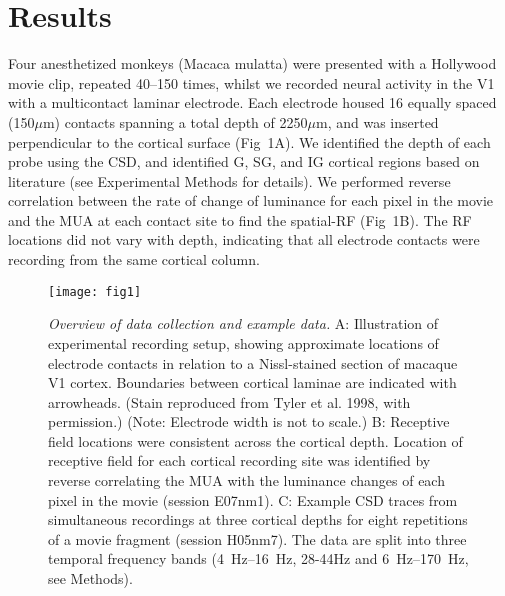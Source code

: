 \section{Results}
Four anesthetized monkeys (Macaca mulatta) were presented with a Hollywood movie clip, repeated 40--150 times, whilst we recorded neural activity in the \ac{V1} with a multicontact laminar electrode.
Each electrode housed 16 equally spaced (150\hspace{0.2em}$\mu$m) contacts spanning a total depth of 2250\hspace{0.2em}$\mu$m, and was inserted perpendicular to the cortical surface (Fig~1A).
We identified the depth of each probe using the \ac{CSD}, and identified \ac{G}, \ac{SG}, and \ac{IG} cortical regions based on literature (see Experimental Methods for details).
We performed reverse correlation between the rate of change of luminance for each pixel in the movie and the \ac{MUA} at each contact site to find the spatial-\ac{RF} (Fig~1B).
The \ac{RF} locations did not vary with depth, indicating that all electrode contacts were recording from the same cortical column.

\begin{figure}[htbp]
\centering \texttt{[image: fig1]}
%
\caption{%
\textit{Overview of data collection and example data.}
A: Illustration of experimental recording setup, showing approximate locations 
of electrode contacts in relation to a Nissl-stained section of macaque \ac{V1} 
cortex.
Boundaries between cortical laminae are indicated with arrowheads.
(Stain reproduced from Tyler et al. 1998, with permission.) (Note: Electrode 
width is not to scale.)
B: Receptive field locations were consistent across the 
cortical depth.
Location of receptive field for each cortical recording site 
was identified by reverse 
correlating the \ac{MUA} with the luminance changes of each 
pixel in the movie (session E07nm1).
C: Example \ac{CSD} traces from simultaneous recordings at three cortical depths for eight 
repetitions of a movie fragment (session H05nm7).
The data are split into three temporal frequency bands (\SIrange{4}{16}{Hz}, 28-44Hz and \SIrange{6}{170}{Hz}, see Methods).
}%
\label{fig:lam_1}
%
\end{figure}

